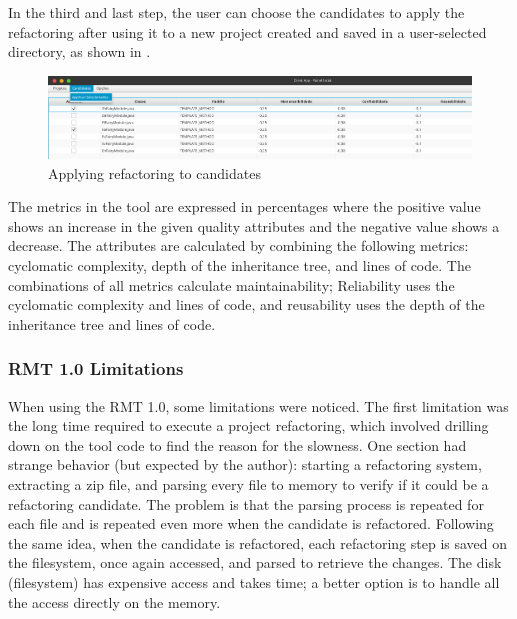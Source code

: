 In the third and last step, the user can choose the candidates to apply the refactoring after using it to a new project created and saved in a user-selected directory, as shown in .

\begin{figure}[ht!]
\SetCaptionWidth{\textwidth}
\caption{Applying refactoring to candidates}
\label{fig-refactor}
\includegraphics[width =\textwidth]{Chapter-2/Figures/refactor.png}
\end{figure}
\FloatBarrier

The metrics in the tool are expressed in percentages where the positive value shows an increase in the given quality attributes and the negative value shows a decrease. The attributes are calculated by combining the following metrics: cyclomatic complexity, depth of the inheritance tree, and lines of code. The combinations of all metrics calculate maintainability; Reliability uses the cyclomatic complexity and lines of code, and reusability uses the depth of the inheritance tree and lines of code. 

\subsubsection{RMT 1.0 Limitations}
\label{subsub-limitation}
When using the RMT 1.0, some limitations were noticed. The first limitation was the long time required to execute a project refactoring, which involved drilling down on the tool code to find the reason for the slowness. One section had strange behavior (but expected by the author): starting a refactoring system, extracting a zip file, and parsing every file to memory to verify if it could be a refactoring candidate. The problem is that the parsing process is repeated for each file and is repeated even more when the candidate is refactored. Following the same idea, when the candidate is refactored, each refactoring step is saved on the filesystem, once again accessed, and parsed to retrieve the changes. The disk (filesystem) has expensive access and takes time; a better option is to handle all the access directly on the memory.

